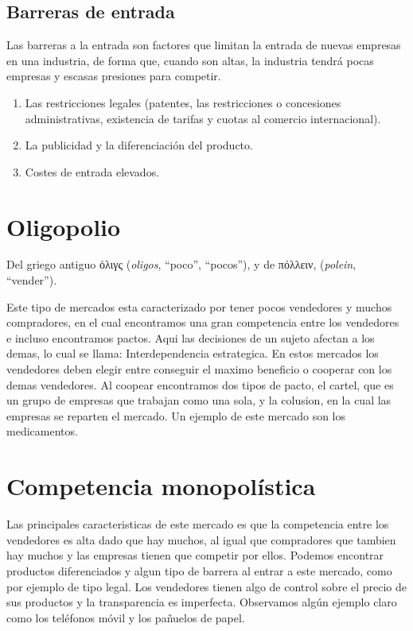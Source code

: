 \documentclass[
]{book}
\providecommand{\tightlist}{%
  \setlength{\itemsep}{0pt}\setlength{\parskip}{0pt}}
\begin{document}
\hypertarget{barreras-de-entrada}{%
\subsection{Barreras de entrada}\label{barreras-de-entrada}}

Las barreras a la entrada son factores que limitan la entrada de nuevas empresas en una industria, de forma que, cuando son altas, la industria tendrá pocas empresas y escasas presiones para competir.

\begin{enumerate}
\def\labelenumi{\arabic{enumi}.}
\tightlist
\item
  Las restricciones legales (patentes, las restricciones o concesiones administrativas, existencia de tarifas y cuotas al comercio internacional).
\item
  La publicidad y la diferenciación del producto.
\item
  Costes de entrada elevados.
\end{enumerate}

\hypertarget{oligopolio}{%
\section{Oligopolio}\label{oligopolio}}

Del griego antiguo ὀλιγς (\emph{oligos}, ``poco'', ``pocos''), y de πόλλειν, (\emph{polein}, ``vender'').

Este tipo de mercados esta caracterizado por tener pocos vendedores y muchos compradores, en el cual encontramos una gran competencia entre los vendedores e incluso encontramos pactos. Aqui las decisiones de un sujeto afectan a los demas, lo cual se llama: Interdependencia estrategica.
En estos mercados los vendedores deben elegir entre conseguir el maximo beneficio o cooperar con los demas vendedores. Al coopear encontramos dos tipos de pacto, el cartel, que es un grupo de empresas que trabajan como una sola, y la colusion, en la cual las empresas se reparten el mercado.
Un ejemplo de este mercado son los medicamentos.

\hypertarget{competencia-monopoluxedstica}{%
\section{Competencia monopolística}\label{competencia-monopoluxedstica}}

Las principales caracteristicas de este mercado es que la competencia entre los vendedores es alta dado que hay muchos, al igual que compradores que tambien hay muchos y las empresas tienen que competir por ellos. Podemos encontrar productos diferenciados y algun tipo de barrera al entrar a este mercado, como por ejemplo de tipo legal. Los vendedores tienen algo de control sobre el precio de sus productos y la transparencia es imperfecta.
Observamos algún ejemplo claro como los teléfonos móvil y los pañuelos de papel.
\end{document}
